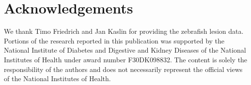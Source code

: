 \documentclass[fleqn,12pt]{wlpeerj}
\begin{document}
\section*{Acknowledgements}
  \label{acknowledgements}

We thank Timo Friedrich and Jan Kaslin for providing the zebrafish lesion data.
Portions of the research reported in this publication was supported by the
National Institute of Diabetes and Digestive and Kidney Diseases of the National
Institutes of Health under award number F30DK098832. The content is solely the
responsibility of the authors and does not necessarily represent the official
views of the National Institutes of Health.


\end{document}
